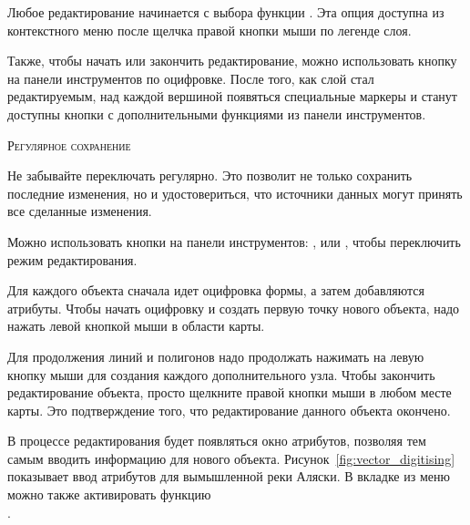 Любое редактирование начинается с выбора функции
.
Эта опция доступна из контекстного меню после щелчка правой кнопки мыши
по легенде слоя.

Также, чтобы начать или закончить редактирование, можно использовать
кнопку 
 на панели инструментов
по оцифровке. После того, как слой стал редактируемым,
над каждой вершиной появяться специальные маркеры и станут доступны кнопки
с дополнительными функциями из панели инструментов.

\begin{Tip}\caption{\textsc{Регулярное сохранение}}
Не забывайте переключать 
регулярно. Это позволит не только сохранить последние изменения, но и удостовериться,
что источники данных могут принять все сделанные изменения.
\end{Tip}


Можно использовать кнопки на панели инструментов:
,
 или
, чтобы переключить \qg
режим редактирования.

Для каждого объекта сначала идет оцифровка формы, а затем добавляются атрибуты.
Чтобы начать оцифровку и создать первую точку нового объекта, надо нажать
левой кнопкой мыши в области карты.

Для продолжения линий и полигонов надо продолжать нажимать на левую кнопку
мыши для создания каждого дополнительного узла. Чтобы закончить
редактирование объекта, просто щелкните правой кнопки мыши в любом
месте карты. Это подтверждение того, что редактирование данного объекта
окончено.

В процессе редактирования будет появляться окно атрибутов, позволяя тем
самым вводить информацию для нового объекта.
Рисунок~\ref{fig:vector_digitising} показывает ввод атрибутов для вымышленной реки
Аляски. В вкладке  из меню  \arrow
{} можно также активировать функцию \\
.

